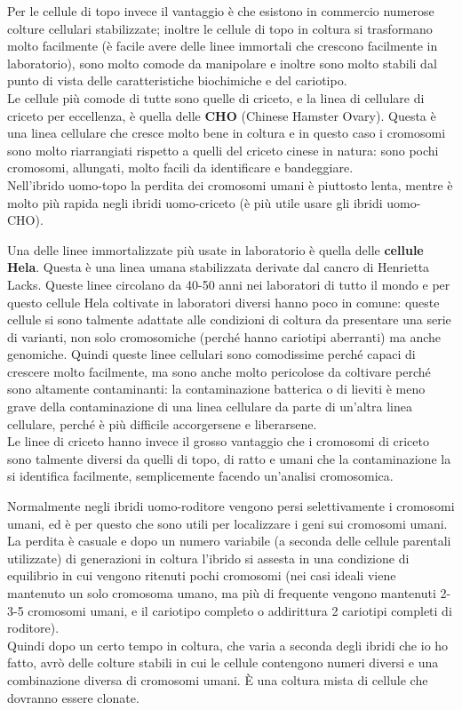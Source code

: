 \documentclass[11pt]{book}
\begin{document}
Per le cellule di topo invece il vantaggio è che esistono in commercio numerose colture cellulari stabilizzate; inoltre le cellule di topo in coltura si trasformano molto facilmente (è facile avere delle linee immortali che crescono facilmente in laboratorio), sono molto comode da manipolare e inoltre sono molto stabili dal punto di vista delle caratteristiche biochimiche e del cariotipo.\\
Le cellule più comode di tutte sono quelle di criceto, e la linea di cellulare di criceto per eccellenza, è quella delle \textbf{CHO} (Chinese Hamster Ovary). Questa è una linea cellulare che cresce molto bene in coltura e in questo caso i cromosomi sono molto riarrangiati rispetto a quelli del criceto cinese in natura: sono pochi cromosomi, allungati, molto facili da identificare e bandeggiare.\\
Nell’ibrido uomo-topo la perdita dei cromosomi umani è piuttosto lenta, mentre è molto più rapida negli ibridi uomo-criceto (è più utile usare gli ibridi uomo-CHO).

Una delle linee immortalizzate più usate in laboratorio è quella delle \textbf{cellule Hela}. Questa è una linea umana stabilizzata derivate dal cancro di Henrietta Lacks. Queste linee circolano da 40-50 anni nei laboratori di tutto il mondo e per questo cellule Hela coltivate in laboratori diversi hanno poco in comune: queste cellule si sono talmente adattate alle condizioni di coltura da presentare una serie di varianti, non solo cromosomiche (perché hanno cariotipi aberranti) ma anche genomiche. Quindi queste linee cellulari sono comodissime perché capaci di crescere molto facilmente, ma sono anche molto pericolose da coltivare perché sono altamente contaminanti: la contaminazione batterica o di lieviti è meno grave della contaminazione di una linea cellulare da parte di un’altra linea cellulare, perché è più difficile accorgersene e liberarsene.\\
Le linee di criceto hanno invece il grosso vantaggio che i cromosomi di criceto sono talmente diversi da quelli di topo, di ratto e umani che la contaminazione la si identifica facilmente, semplicemente facendo un’analisi cromosomica.

Normalmente negli ibridi uomo-roditore vengono persi selettivamente i cromosomi umani, ed è per questo che sono utili per localizzare i geni sui cromosomi umani.\\
La perdita è casuale e dopo un numero variabile (a seconda delle cellule parentali utilizzate) di generazioni in coltura l’ibrido si assesta in una condizione di equilibrio in cui vengono ritenuti pochi cromosomi (nei casi ideali viene mantenuto un solo cromosoma umano, ma più di frequente vengono mantenuti 2-3-5 cromosomi umani, e il cariotipo completo o addirittura 2 cariotipi completi di roditore).\\
Quindi dopo un certo tempo in coltura, che varia a seconda degli ibridi che io ho fatto, avrò delle colture stabili in cui le cellule contengono numeri diversi e una combinazione diversa di cromosomi umani.
È una coltura mista di cellule che dovranno essere clonate.
 
\end{document}
